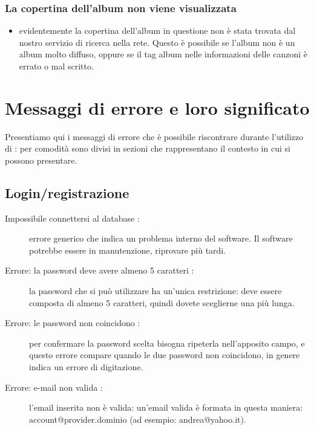 \subsection*{La copertina dell'album non viene visualizzata}
\begin{itemize}
  \item evidentemente la copertina dell'album in questione non \`e stata
  trovata dal nostro servizio di ricerca nella rete. Questo \`e possibile se
  l'album non \`e un album molto diffuso, oppure se il tag album nelle
  informazioni delle canzoni \`e errato o mal scritto.
\end{itemize}

\listoffigures
{}

\appendix %
\chapter{Messaggi di errore e loro significato}
\thispagestyle{fancy}
Presentiamo qui i messaggi di errore che \`e possibile riscontrare durante
l'utilizzo di : per comodit\`a sono divisi in sezioni che
rappresentano il contesto in cui si possono presentare.
\section{Login/registrazione}
\begin{description}
	\item[Impossibile connettersi al database :] errore generico che
	indica un problema interno del software. Il software potrebbe essere in manutenzione,
	riprovare pi\`u tardi.
	\item[Errore: la password deve avere almeno 5 caratteri :] la password
	che si pu\`o utilizzare ha un'unica restrizione: deve essere composta di almeno 5
	caratteri, quindi dovete sceglierne una pi\`u lunga.
	\item [Errore: le password non coincidono :] per confermare la
	password scelta bisogna ripeterla nell'apposito campo, e questo errore compare
	quando le due password non coincidono, in genere indica un errore di
	digitazione.
	\item[Errore: e-mail non valida :] l'email inserita non \`e valida:
	un'email valida \`e formata in questa maniera: account@provider.dominio (ad
	esempio: andrea@yahoo.it).
\end{description}

